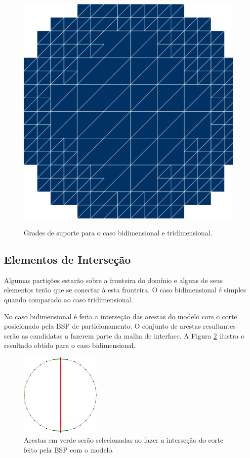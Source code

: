 \begin{figure}[!ht]
{     		\begin{minipage}[c]{0.4\textwidth}{\includegraphics[width=\textwidth]{fig/esfera3_grade.png}}\end{minipage}
     	}    
     	\caption{Grades de suporte para o caso bidimensional e tridimensional.}
     	\label{fig:grades_modelos}
     \end{figure}
     
        
\subsection{Elementos de Interseção}
\label{sec:Elementos_Intersecao}

Algumas partições estarão sobre a fronteira do domínio e alguns de seus elementos terão que se conectar à esta fronteira. O caso bidimensional é simples quando comparado ao caso tridimensional.

No caso bidimensional é feita a interseção das arestas do modelo com o corte posicionado pela BSP de particionamento. O conjunto de arestas resultantes serão as candidatas a fazerem parte da malha de interface. A Figura \ref{fig:circulo_arestas} ilustra o resultado obtido para o caso bidimensional.


\begin{figure}[!ht]
	\centering
	\includegraphics[width=0.35\textwidth]{fig/circulo2_arestas.png}
	\caption{Arestas em verde serão selecionadas ao fazer a interseção do corte feito pela BSP com o modelo.}
	\label{fig:circulo_arestas}
\end{figure}


